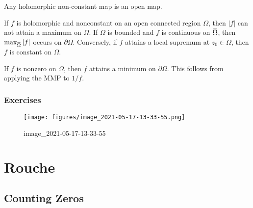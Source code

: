 
\begin{corollary}

Any holomorphic non-constant map is an open map.

\end{corollary}


\begin{corollary}\label{MaximumModulus}

If \(f\) is holomorphic and nonconstant on an open connected region
\(\Omega\), then \({\left\lvert {f} \right\rvert}\) can not attain a
maximum on \(\Omega\). If \(\Omega\) is bounded and \(f\) is continuous
on
\(\mkern 1.5mu\overline{\mkern-1.5mu\Omega\mkern-1.5mu}\mkern 1.5mu\),
then
\(\max_{\mkern 1.5mu\overline{\mkern-1.5mu\Omega\mkern-1.5mu}\mkern 1.5mu} {\left\lvert {f} \right\rvert}\)
occurs on \({{\partial}}\Omega\). Conversely, if \(f\) attains a local
supremum at \(z_0 \in \Omega\), then \(f\) is constant on \(\Omega\).

\end{corollary}


\begin{corollary}[?]

If \(f\) is nonzero on \(\Omega\), then \(f\) attains a minimum on
\({{\partial}}\Omega\). This follows from applying the MMP to \(1/f\).

\end{corollary}

\hypertarget{exercises-4}{%
\subsubsection{Exercises}\label{exercises-4}}

\begin{figure}
\centering
\texttt{[image: figures/image\_2021-05-17-13-33-55.png]}
\caption{image\_2021-05-17-13-33-55}
\end{figure}

\hypertarget{rouche}{%
\section{Rouche}\label{rouche}}

\hypertarget{counting-zeros}{%
\subsection{Counting Zeros}\label{counting-zeros}}

